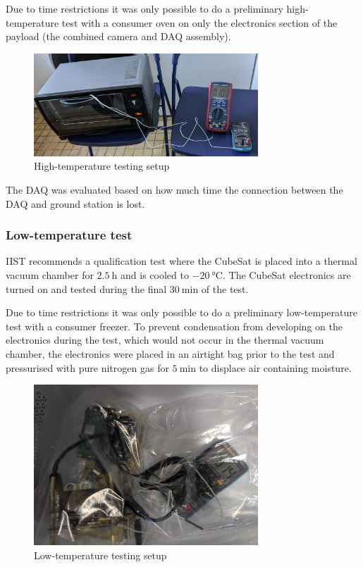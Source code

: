 \documentclass{report}
\begin{document}
Due to time restrictions it was only possible to do a preliminary high-temperature test with a consumer oven on only the electronics section of the payload (the combined camera and DAQ assembly).

\begin{figure}[H]
  \centering
  \includegraphics[width=0.75\textwidth]{images/oven_test.jpg}
  \caption{High-temperature testing setup}
  \label{fig:temperature-testing-oven}
\end{figure}

The DAQ was evaluated based on how much time the connection between the DAQ and ground station is lost.

\subsubsection{Low-temperature test}
\label{sec:ltemp-test-framework}
IIST recommends a qualification test where the CubeSat is placed into a thermal vacuum chamber for $\SI{2.5}{\hour}$ and is cooled to $\SI{-20}{\degreeCelsius}$. The CubeSat electronics are turned on and tested during the final $\SI{30}{\minute}$ of the test.

Due to time restrictions it was only possible to do a preliminary low-temperature test with a consumer freezer. To prevent condensation from developing on the electronics during the test, which would not occur in the thermal vacuum chamber, the electronics were placed in an airtight bag prior to the test and pressurised with pure nitrogen gas for $\SI{5}{\minute}$ to displace air containing moisture.

\begin{figure}[H]
  \centering
  \includegraphics[width=0.75\textwidth]{images/fridge_test.jpg}
  \caption{Low-temperature testing setup}
  \label{fig:temperature-testing-fridge}
\end{figure}
\end{document}
